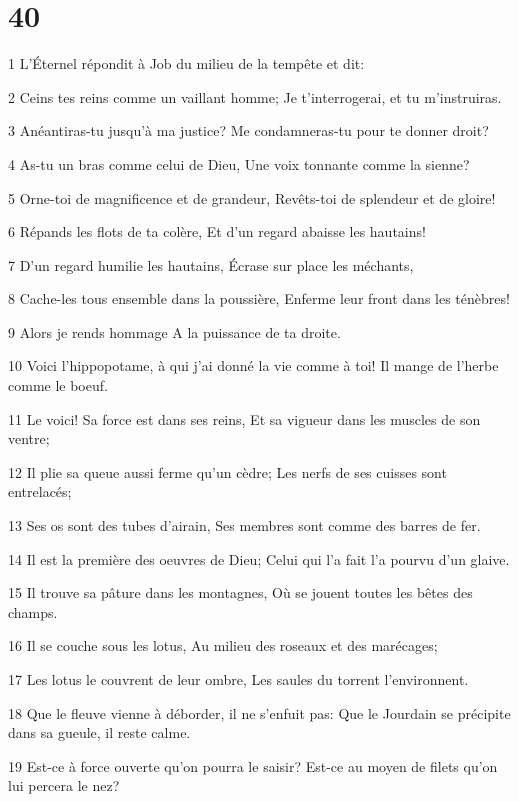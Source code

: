 \chapter{40}

\par 1 L'Éternel répondit à Job du milieu de la tempête et dit:
\par 2 Ceins tes reins comme un vaillant homme; Je t'interrogerai, et tu m'instruiras.
\par 3 Anéantiras-tu jusqu'à ma justice? Me condamneras-tu pour te donner droit?
\par 4 As-tu un bras comme celui de Dieu, Une voix tonnante comme la sienne?
\par 5 Orne-toi de magnificence et de grandeur, Revêts-toi de splendeur et de gloire!
\par 6 Répands les flots de ta colère, Et d'un regard abaisse les hautains!
\par 7 D'un regard humilie les hautains, Écrase sur place les méchants,
\par 8 Cache-les tous ensemble dans la poussière, Enferme leur front dans les ténèbres!
\par 9 Alors je rends hommage A la puissance de ta droite.
\par 10 Voici l'hippopotame, à qui j'ai donné la vie comme à toi! Il mange de l'herbe comme le boeuf.
\par 11 Le voici! Sa force est dans ses reins, Et sa vigueur dans les muscles de son ventre;
\par 12 Il plie sa queue aussi ferme qu'un cèdre; Les nerfs de ses cuisses sont entrelacés;
\par 13 Ses os sont des tubes d'airain, Ses membres sont comme des barres de fer.
\par 14 Il est la première des oeuvres de Dieu; Celui qui l'a fait l'a pourvu d'un glaive.
\par 15 Il trouve sa pâture dans les montagnes, Où se jouent toutes les bêtes des champs.
\par 16 Il se couche sous les lotus, Au milieu des roseaux et des marécages;
\par 17 Les lotus le couvrent de leur ombre, Les saules du torrent l'environnent.
\par 18 Que le fleuve vienne à déborder, il ne s'enfuit pas: Que le Jourdain se précipite dans sa gueule, il reste calme.
\par 19 Est-ce à force ouverte qu'on pourra le saisir? Est-ce au moyen de filets qu'on lui percera le nez?
